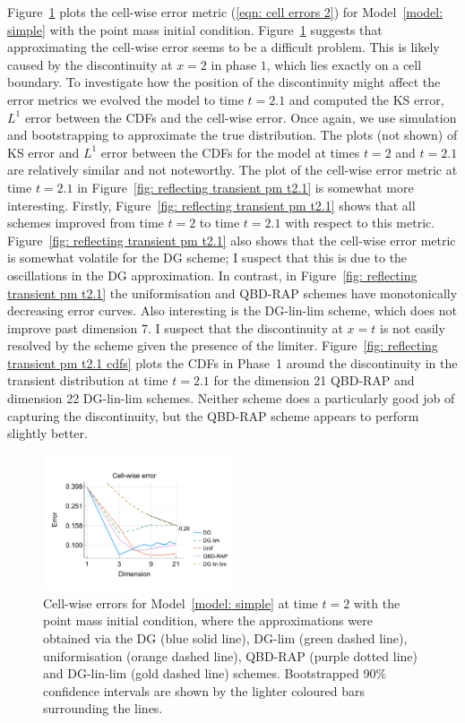Figure~\ref{fig: reflecting transient pm cp} plots the cell-wise error metric (\ref{eqn: cell errors 2}) for Model~\ref{model: simple} with the point mass initial condition. Figure~\ref{fig: reflecting transient pm cp} suggests that approximating the cell-wise error seems to be a difficult problem. This is likely caused by the discontinuity at \(x=2\) in phase \(1\), which lies exactly on a cell boundary. To investigate how the position of the discontinuity might affect the error metrics we evolved the model to time \(t=2.1\) and computed the KS error, \(L^1\) error between the CDFs and the cell-wise error. Once again, we use simulation and bootstrapping to approximate the true distribution. The plots (not shown) of KS error and \(L^1\) error between the CDFs for the model at times \(t=2\) and \(t=2.1\) are relatively similar and not noteworthy. The plot of the cell-wise error metric at time \(t=2.1\) in Figure~\ref{fig: reflecting transient pm t2.1} is somewhat more interesting. Firstly, Figure~\ref{fig: reflecting transient pm t2.1} shows that all schemes improved from time \(t=2\) to time \(t=2.1\) with respect to this metric. Figure~\ref{fig: reflecting transient pm t2.1} also shows that the cell-wise error metric is somewhat volatile for the DG scheme; I suspect that this is due to the oscillations in the DG approximation. In contrast, in Figure~\ref{fig: reflecting transient pm t2.1} the uniformisation and QBD-RAP schemes have monotonically decreasing error curves. Also interesting is the DG-lin-lim scheme, which does not improve past dimension 7. I suspect that the discontinuity at \(x=t\) is not easily resolved by the scheme given the presence of the limiter. Figure~\ref{fig: reflecting transient pm t2.1 cdfs} plots the CDFs in Phase~1 around the discontinuity in the transient distribution at time \(t=2.1\) for the dimension 21 QBD-RAP and dimension 22 DG-lin-lim schemes. Neither scheme does a particularly good job of capturing the discontinuity, but the QBD-RAP scheme appears to perform slightly better. 
\begin{figure}[h]
	\centering
	\includegraphics[width=0.5\textwidth,trim={0.75cm 0.8cm 0.25cm 1.25cm},clip]{chapter6/figs/hitting_times_model/reflecting_model/transient_distribution/point_mass/L1_cell_probs_error_formatted.pdf}
	\caption{Cell-wise errors for Model~\ref{model: simple} at time \(t=2\) with the point mass initial condition, where the approximations were obtained via the DG (blue solid line), DG-lim (green dashed line), uniformisation (orange dashed line), QBD-RAP (purple dotted line) and DG-lin-lim (gold dashed line) schemes. Bootstrapped 90\% confidence intervals are shown by the lighter coloured bars surrounding the lines.} 
	\label{fig: reflecting transient pm cp} 
\end{figure}%
